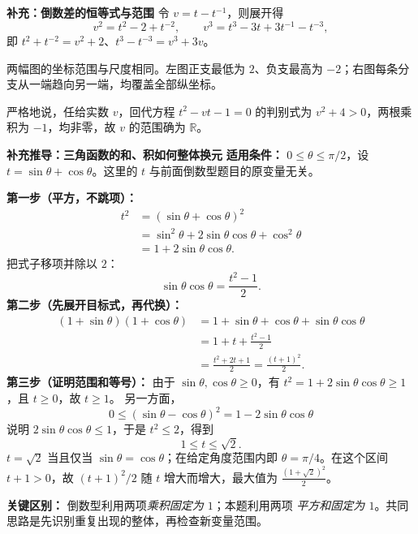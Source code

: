 \clearpage
\begin{proofbox}
\textbf{\textcolor{CProof}{补充：倒数差的恒等式与范围}}
令 $v=t-t^{-1}$，则展开得
\[
v^2=t^2-2+t^{-2},\qquad v^3=t^3-3t+3t^{-1}-t^{-3},
\]
即 $t^2+t^{-2}=v^2+2$、$t^3-t^{-3}=v^3+3v$。

两幅图的坐标范围与尺度相同。左图正支最低为 $2$、负支最高为 $-2$；右图每条分支从一端趋向另一端，均覆盖全部纵坐标。

严格地说，任给实数 $v$，回代方程 $t^2-vt-1=0$ 的判别式为 $v^2+4>0$，两根乘积为 $-1$，均非零，故 $v$ 的范围确为 $\mathbb R$。
\end{proofbox}
\clearpage

\begin{proofbox}
\textbf{\textcolor{CProof}{补充推导：三角函数的和、积如何整体换元}}
\textbf{适用条件：} $0\le\theta\le\pi/2$，设
$t=\sin\theta+\cos\theta$。这里的 $t$ 与前面倒数型题目的原变量无关。

\textbf{第一步（平方，不跳项）：}
\[
\begin{aligned}
t^2&=(\sin\theta+\cos\theta)^2\\
&=\sin^2\theta+2\sin\theta\cos\theta+\cos^2\theta\\
&=1+2\sin\theta\cos\theta.
\end{aligned}
\]
把式子移项并除以 $2$：
\[
\boxed{\sin\theta\cos\theta=\frac{t^2-1}{2}}.
\]
\textbf{第二步（先展开目标式，再代换）：}
\[
\begin{aligned}
(1+\sin\theta)(1+\cos\theta)
&=1+\sin\theta+\cos\theta+\sin\theta\cos\theta\\
&=1+t+\frac{t^2-1}{2}\\
&=\frac{t^2+2t+1}{2}
=\boxed{\frac{(t+1)^2}{2}}.
\end{aligned}
\]
\textbf{第三步（证明范围和等号）：}
由于 $\sin\theta,\cos\theta\ge0$，有
$t^2=1+2\sin\theta\cos\theta\ge1$，且 $t\ge0$，故 $t\ge1$。
另一方面，
\[
0\le(\sin\theta-\cos\theta)^2
=1-2\sin\theta\cos\theta
\]
说明 $2\sin\theta\cos\theta\le1$，于是 $t^2\le2$，得到
\[
\boxed{1\le t\le\sqrt2}.
\]
$t=\sqrt2$ 当且仅当 $\sin\theta=\cos\theta$；在给定角度范围内即
$\theta=\pi/4$。在这个区间 $t+1>0$，故 $(t+1)^2/2$
随 $t$ 增大而增大，最大值为 $\frac{(1+\sqrt2)^2}{2}$。

\textbf{关键区别：} 倒数型利用两项\emph{乘积固定为 $1$}；本题利用两项
\emph{平方和固定为 $1$}。共同思路是先识别重复出现的整体，再检查新变量范围。
\end{proofbox}
\clearpage

